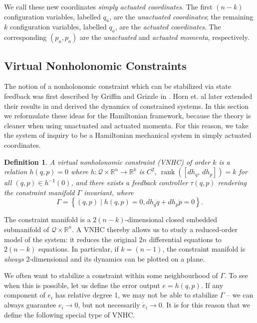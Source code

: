 \documentclass[journal,twoside,web]{ieeecolor}
\newtheorem{defn}[thm]{Definition} %
\DeclareMathOperator{\Rank}{rank}
\newcommand*{\rank}[1]{\Rank\left(#1\right)}
\newcommand*{\inv}{^\mathsf{-1}}
\newcommand*{\R}{\mathbb{R}}
\begin{document}
We call these new coordinates 
\textit{simply actuated coordinates}.
The first \((n-k)\) configuration variables, labelled \(q_u\), are
the \textit{unactuated coordinates}; 
the remaining \(k\) configuration variables, labelled \(q_a\), are the
\textit{actuated coordinates}.
The corresponding \((p_u, p_a)\) are the \textit{unactuated} and 
\textit{actuated momenta}, respectively.

\subsection{Virtual Nonholonomic Constraints}

The notion of a nonholonomic constraint which can be stabilized via state feedback
was first described by Griffin and Grizzle in \cite{nhvc_dynamic_walking}.
Horn et. al later extended their results in
\cite{hybrid_zero_dynamics_bipedal_nhvcs} and
derived the dynamics of constrained systems.
In this section we reformulate these ideas for the Hamiltonian framework,
because the theory is cleaner when using unactuated and actuated momenta.
For this reason, we take the system of inquiry to be a Hamiltonian
mechanical system in simply actuated coordinates.

\begin{defn}\label{defn:vnhc}
    A \textit{virtual nonholonomic constraint} (VNHC) \textit{of order \(k\)} is a
    relation \(h(q,p) = 0\) where \(h : \mathcal{Q}\times\R^n \rightarrow \R^k\) is
    \(C^2\), \(\rank{\left[ dh_q,\, dh_p \right]} = k\) for all 
    \((q,p) \in h\inv(0)\), and there exists a feedback controller \(\tau(q,p)\)
    rendering the \textit{constraint manifold} \(\Gamma\) invariant,
    where
    \begin{equation}
        \Gamma = \left\{(q,p) \mid h(q,p) = 0, dh_q \dot{q} + dh_p \dot{p} = 0\right\}
        .
    \end{equation}
\end{defn}

The constraint manifold is a \(2(n-k)\)-dimensional
closed embedded submanifold of \(\mathcal{Q} \times \R^n\).
A VNHC thereby allows us to study a reduced-order model of the system: it reduces
the original \(2n\) differential equations to \(2(n-k)\) equations.
In particular, if \(k = (n-1)\), the constraint manifold is \textit{always}
2-dimensional and its dynamics can be plotted on a plane. 

We often want to stabilize a constraint within some neighbourhood of \(\Gamma\).
To see when this is possible, let us define the error output \(e = h(q,p)\).
If any component of \(e_i\) has relative degree 1, we may not be able
to stabilize \(\Gamma\) -- we can always guarantee \(e_i \to 0\), but not
necessarily \(\dot{e}_i \to 0\).
It is for this reason that we define the following special type of VNHC.
\end{document}
